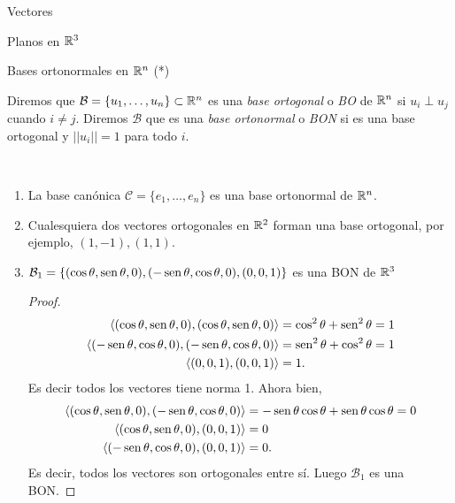 \begin{chapter}{Vectores}
\begin{section}{Planos en $\mathbb R^3$}
   \end{section}

   \begin{section}{Bases ortonormales en $\mathbb R^n$ (*)}


    \begin{definicion} 
        Diremos que $\mathcal B =\{u_1,\ldots,u_n\}\subset \mathbb R^n$ es una \textit{base ortogonal} o \textit{BO} de $\mathbb R^n$ si $u_i \perp u_j$ cuando $i\ne j$. Diremos $\mathcal B$ que es una \textit{base ortonormal} o \textit{BON} si es una base ortogonal y $||u_i||=1$ para todo $i$.  
    \end{definicion}

    \begin{ejemplo*} 

        \

        \begin{enumerate}
            \item La base canónica $\mathcal C= \{e_1,\ldots,e_n\}$  es una base ortonormal de $\mathbb R^n$. 
            \item Cualesquiera dos vectores ortogonales en $\mathbb R^2$ forman una base ortogonal, por ejemplo, $(1,-1), (1,1)$.
            \item $\mathcal B_1 = \{(\cos\theta, \operatorname{sen}\theta,0),  (-\operatorname{sen}\theta, \cos\theta,0 ),  (0,0,1)\}$ es una BON  de $\mathbb R^3$
            \begin{proof}
                \begin{align*}
                    \langle (\cos\theta, \operatorname{sen}\theta,0), (\cos\theta, \operatorname{sen}\theta,0)\rangle &= \cos^2\theta+ \operatorname{sen}^2\theta = 1\\
                    \langle (-\operatorname{sen}\theta, \cos\theta,0 ),  (-\operatorname{sen}\theta, \cos\theta,0 )\rangle &= \operatorname{sen}^2\theta +\cos^2\theta = 1\\
                    \langle (0,0,1),  (0,0,1)\rangle &=1.
                \end{align*}
                Es decir todos los vectores tiene norma 1. Ahora bien,
                \begin{align*}
                    \langle (\cos\theta, \operatorname{sen}\theta,0),  (-\operatorname{sen}\theta, \cos\theta,0 )\rangle &= -\operatorname{sen}\theta\cos\theta+ \operatorname{sen}\theta\cos\theta = 0\\
                    \langle (\cos\theta, \operatorname{sen}\theta,0),  (0,0,1 )\rangle &=0\\
                    \langle  (-\operatorname{sen}\theta, \cos\theta,0 ),  (0,0,1 )\rangle &=0.
                \end{align*}
                Es decir,  todos los vectores son ortogonales entre sí. Luego $\mathcal B_1$  es una BON.
                

\end{proof}
\end{enumerate}
\end{ejemplo*}
\end{section}
\end{chapter}

